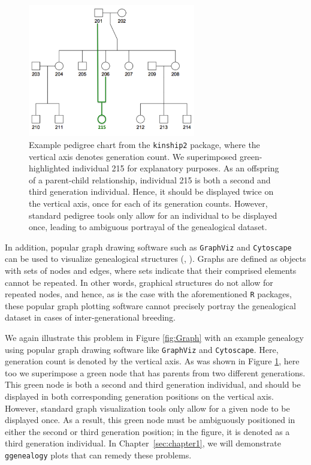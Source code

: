 \documentclass[11pt,a4paper,oldfontcommands,openany]{memoir}
\numberwithin{equation}{section} %
\newcommand{\pkg}[1]{{\texttt{#1}}}
\begin{document}
\begin{figure}[H]
    \begin{framed}
    \centering
    \includegraphics[width=0.65\textwidth]{kinshipFig}
    \end{framed}
    \caption{Example pedigree chart from the \pkg{kinship2} package, where the vertical axis denotes generation count. We superimposed green-highlighted individual 215 for explanatory purposes. As an offspring of a parent-child relationship, individual 215 is both a second and third generation individual. Hence, it should be displayed twice on the vertical axis, once for each of its generation counts. However, standard pedigree tools only allow for an individual to be displayed once, leading to ambiguous portrayal of the genealogical dataset.}
    \label{fig:kinshipFig}
\end{figure}

In addition, popular graph drawing software such as \pkg{GraphViz} and \pkg{Cytoscape} can be used to visualize genealogical structures (\citealt{graphvizCit}, \citealt{cytoscapeCit}). Graphs are defined as objects with sets of nodes and edges, where sets indicate that their comprised elements cannot be repeated. In other words, graphical structures do not allow for repeated nodes, and hence, as is the case with the aforementioned \pkg{R} packages, these popular graph plotting software cannot precisely portray the genealogical dataset in cases of inter-generational breeding.

We again illustrate this problem in Figure \ref{fig:Graph} with an example genealogy using popular graph drawing software like \pkg{GraphViz} and \pkg{Cytoscape}. Here, generation count is denoted by the vertical axis. As was shown in Figure \ref{fig:kinshipFig}, here too we superimpose a green node that has parents from two different generations. This green node is both a second and third generation individual, and should be displayed in both corresponding generation positions on the vertical axis. However, standard graph visualization tools only allow for a given node to be displayed once. As a result, this green node must be ambiguously positioned in either the second or third generation position; in the figure, it is denoted as a third generation individual. In Chapter~\ref{sec:chapter1}, we will demonstrate \pkg{ggenealogy} plots that can remedy these problems.
\end{document}
